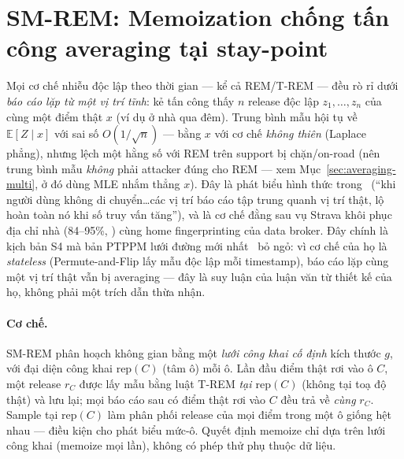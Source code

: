 \section{SM-REM: Memoization chống tấn công averaging tại stay-point}
\label{sec:smrem}

Mọi cơ chế nhiễu độc lập theo thời gian --- kể cả REM/T-REM --- đều rò rỉ dưới
\emph{báo cáo lặp từ một vị trí tĩnh}: kẻ tấn công thấy $n$ release độc lập
$z_1,\dots,z_n$ của cùng một điểm thật $x$ (ví dụ ở nhà qua đêm). Trung bình mẫu
hội tụ về $\mathbb{E}[Z\mid x]$ với sai số $O(1/\sqrt n)$ --- bằng $x$ với cơ chế
\emph{không thiên} (Laplace phẳng), nhưng lệch một hằng số với REM trên support
bị chặn/on-road (nên trung bình mẫu \emph{không} phải attacker đúng cho REM ---
xem Mục~\ref{sec:averaging-multi}, ở đó dùng MLE nhắm thẳng $x$).
Đây là phát biểu hình thức trong~\cite{chatzikokolakis2014predictive} (``khi
người dùng không di chuyển\ldots các vị trí báo cáo tập trung quanh vị trí thật,
lộ hoàn toàn nó khi số truy vấn tăng''), và là cơ chế đằng sau vụ Strava khôi
phục địa chỉ nhà (84--95\%, \cite{hassan2018run,dhondt2022run}) cùng home
fingerprinting của data broker. Đây chính là kịch bản S4 mà bản PTPPM lưới đường
mới nhất~\cite{min2025road} bỏ ngỏ: vì cơ chế của họ là \emph{stateless}
(Permute-and-Flip lấy mẫu độc lập mỗi timestamp), báo cáo lặp cùng một vị trí thật
vẫn bị averaging --- đây là suy luận của luận văn từ thiết kế của họ, không phải
một trích dẫn thừa nhận.

\paragraph{Cơ chế.} SM-REM phân hoạch không gian bằng một \emph{lưới công khai cố
định} kích thước $g$, với đại diện công khai $\mathrm{rep}(C)$ (tâm ô) mỗi ô. Lần
đầu điểm thật rơi vào ô $C$, một release $r_C$ được lấy mẫu bằng luật T-REM
\emph{tại $\mathrm{rep}(C)$} (không tại toạ độ thật) và lưu lại; mọi báo cáo sau có
điểm thật rơi vào $C$ đều trả về \emph{cùng} $r_C$. Sample tại $\mathrm{rep}(C)$
làm phân phối release của mọi điểm trong một ô giống hệt nhau --- điều kiện cho
phát biểu mức-ô. Quyết định memoize chỉ dựa trên lưới công khai (memoize mọi lần),
không có phép thử phụ thuộc dữ liệu.

